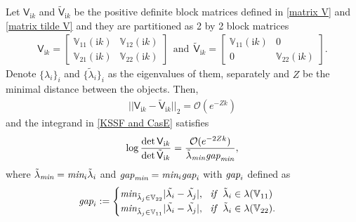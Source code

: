 \begin{theorem}
    Let $\mathsf{V}_{\mathrm{i}k}$ and $\tilde{\mathsf{V}}_{\mathrm{i}k}$ be the positive definite block matrices defined in \eqref{matrix V} and \eqref{matrix tilde V} 
    and they are partitioned as 
    2 by 2 block matrices
    \begin{align*}
        \mathsf{V}_{\mathrm{i}k} = \begin{bmatrix}
            \mathbb{V}_{11}(\mathrm{i}k) & \mathbb{V}_{12}(\mathrm{i}k)\\
            \mathbb{V}_{21}(\mathrm{i}k) & \mathbb{V}_{22}(\mathrm{i}k)
        \end{bmatrix} \ \ \text{and} \ \   \tilde{\mathsf{V}}_{\mathrm{i}k} = \begin{bmatrix}
            \mathbb{V}_{11}(\mathrm{i}k) & 0\\
            0 & \mathbb{V}_{22}(\mathrm{i}k)
        \end{bmatrix}.
    \end{align*} Denote 
    $\{\lambda_{i}\}_{i}$ and $\{\tilde{\lambda}_{i}\}_{i}$ as the eigenvalues of them, separately and $Z$ be the minimal distance between the objects.
    Then, \begin{align*}
        ||\mathsf{V}_{\mathrm{i}k} - \tilde{\mathsf{V}}_{\mathrm{i}k}||_{2} = \mathcal{O}(e^{-Zk})
    \end{align*}
    and the integrand in \eqref{KSSF and CasE} satisfies
    \begin{align}\label{logdet trend}
        \log\frac{\det\mathsf{V}_{\mathrm{i}k}}{\det\tilde{\mathsf{V}}_{\mathrm{i}k}} = \frac{\mathcal{O}(e^{-2Zk})}{\tilde{\lambda}_{\emph{min}}\emph{gap}_{\emph{min}}},
    \end{align}
    where $\tilde{\lambda}_{\emph{min}} = \emph{min}_{i}\tilde{\lambda}_{i}$ and $\emph{gap}_{\emph{min}} = \emph{min}_{i}\emph{gap}_{i}$ with $\emph{gap}_{i}$ defined as 
    \begin{align*}
        \emph{gap}_{i}:= \begin{cases}
            \emph{min}_{\tilde{\lambda}_{j}\in\mathbb{V}_{22}}|\tilde{\lambda_{i}} - \tilde{\lambda_{j}}|, \ \ \emph{if}\ \ \tilde{\lambda}_{i} \in \lambda(\mathbb{V}_{11})\\
            \emph{min}_{\tilde{\lambda}_{j}\in\mathbb{V}_{11}}|\tilde{\lambda_{i}} - \tilde{\lambda_{j}}|, \ \ \emph{if}\ \  \tilde{\lambda}_{i} \in \lambda(\mathbb{V}_{22}).
        \end{cases}
    \end{align*} 
\end{theorem}
